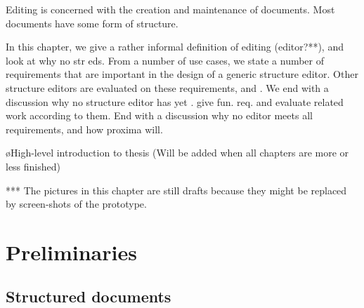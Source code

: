 \bc
Editing is concerned with the creation and maintenance of documents.  
Most documents have some form of structure. 

In this chapter, we give a rather informal definition of editing (editor?**), and look at why no str eds. From a number of use cases, we state a number of requirements that are important in the design of a generic structure editor. Other structure editors are evaluated on these requirements, and . We end with a discussion why no structure editor has yet .  give fun. req. and evaluate related work according to them. End with a discussion why no editor meets all requirements, and how proxima will.
\ec

%								
%								
%								



\bl
\o High-level introduction to thesis (Will be added when all chapters are more or less finished)
\el





*** The pictures in this chapter are still drafts because they might be replaced by screen-shots of the prototype.\\

\section{Preliminaries}

\subsection{Structured documents} \label{sect:structdocs}


